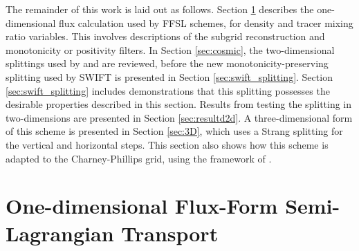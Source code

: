 \documentclass[11pt,a4paper]{article}
\begin{document}
The remainder of this work is laid out as follows.
Section \ref{sec:1d_ffsl} describes the one-dimensional flux calculation used by FFSL schemes, for density and tracer mixing ratio variables.
This involves descriptions of the subgrid reconstruction and monotonicity or positivity filters.
In Section \ref{sec:cosmic}, the two-dimensional splittings used by \cite{lin1996ffsl} and \cite{leonard1996cosmic} are reviewed, before the new monotonicity-preserving splitting used by SWIFT is presented in Section \ref{sec:swift_splitting}.
Section \ref{sec:swift_splitting} includes demonstrations that this splitting possesses the desirable properties described in this section.
Results from testing the splitting in two-dimensions are presented in Section \ref{sec:resultd2d}.
A three-dimensional form of this scheme is presented in Section \ref{sec:3D}, which uses a Strang splitting for the vertical and horizontal steps. This section also shows how this scheme is adapted to the Charney-Phillips grid, using the framework of \cite{bendall2023solution}.


\section{One-dimensional Flux-Form Semi-Lagrangian Transport} \label{sec:1d_ffsl}
\end{document}
